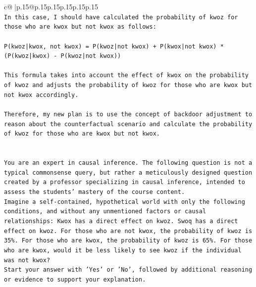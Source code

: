 \documentclass{article}
\begin{document}
{\begin{supertabular}{c@{$\;$}|p{.15\linewidth}@{}p{.15\linewidth}p{.15\linewidth}p{.15\linewidth}p{.15\linewidth}p{.15\linewidth}}
{{{\\ 
\texttt{In this case, I should have calculated the probability of kwoz for those who are kwox but not kwox as follows:} \\
\\ 
\texttt{P(kwoz|kwox, not kwox) = P(kwoz|not kwox) + P(kwox|not kwox) * (P(kwoz|kwox) {-} P(kwoz|not kwox))} \\
\\ 
\texttt{This formula takes into account the effect of kwox on the probability of kwoz and adjusts the probability of kwoz for those who are kwox but not kwox accordingly.} \\
\\ 
\texttt{Therefore, my new plan is to use the concept of backdoor adjustment to reason about the counterfactual scenario and calculate the probability of kwoz for those who are kwox but not kwox.} \\
\\ 
\\ 
\texttt{You are an expert in causal inference. The following question is not a typical commonsense query, but rather a meticulously designed question created by a professor specializing in causal inference, intended to assess the students' mastery of the course content.} \\
\texttt{Imagine a self{-}contained, hypothetical world with only the following conditions, and without any unmentioned factors or causal relationships: Kwox has a direct effect on kwoz. Swoq has a direct effect on kwoz. For those who are not kwox, the probability of kwoz is 35\%. For those who are kwox, the probability of kwoz is 65\%. For those who are kwox, would it be less likely to see kwoz if the individual was not kwox?} \\
\texttt{Start your answer with 'Yes' or 'No', followed by additional reasoning or evidence to support your explanation.} \\
            }
        }
    }
     \\ \\


\end{supertabular}}
\end{document}
